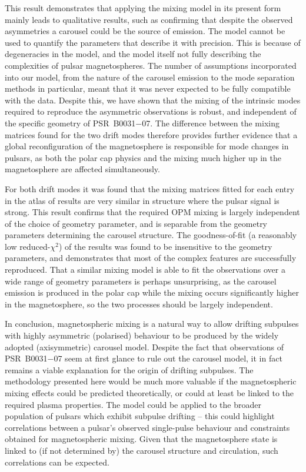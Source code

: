 This result demonstrates that applying the mixing model in its present form mainly leads to qualitative results, such as confirming that despite the observed asymmetries a carousel could be the source of emission. The model cannot be used to quantify the parameters that describe it with precision. This is because of degeneracies in the model, and the model itself not fully describing the complexities of pulsar magnetospheres. The number of assumptions incorporated into our model, from the nature of the carousel emission to the mode separation methods in particular, meant that it was never expected to be fully compatible with the data. Despite this, we have shown that the mixing of the intrinsic modes required to reproduce the asymmetric observations is robust, and independent of the specific geometry of PSR~B0031$-$07. The difference between the mixing matrices found for the two drift modes therefore provides further evidence that a global reconfiguration of the magnetosphere is responsible for mode changes in pulsars, as both the polar cap physics and the mixing much higher up in the magnetosphere are affected simultaneously.

For both drift modes it was found that the mixing matrices fitted for each entry in the atlas of results are very similar in structure where the pulsar signal is strong. This result confirms that the required OPM mixing is largely independent of the choice of geometry parameter, and is separable from the geometry parameters determining the carousel structure. The goodness-of-fit (a reasonably low reduced-$\chi^2$) of the results was found to be insensitive to the geometry parameters, and demonstrates that most of the complex features are successfully reproduced. That a similar mixing model is able to fit the observations over a wide range of geometry parameters is perhaps unsurprising, as the carousel emission is produced in the polar cap while the mixing occurs significantly higher in the magnetosphere, so the two processes should be largely independent.

In conclusion, magnetospheric mixing is a natural way to allow drifting subpulses with highly asymmetric (polarised) behaviour to be produced by the widely adopted (axisymmetric) carousel model. Despite the fact that observations of PSR~B0031$-$07 seem at first glance to rule out the carousel model, it in fact remains a viable explanation for the origin of drifting subpulses. The methodology presented here would be much more valuable if the magnetospheric mixing effects could be predicted theoretically, or could at least be linked to the required plasma properties. The model could be applied to the broader population of pulsars which exhibit subpulse drifting -- this could highlight correlations between a pulsar's observed single-pulse behaviour and constraints obtained for magnetospheric mixing. Given that the magnetosphere state is linked to (if not determined by) the carousel structure and circulation, such correlations can be expected.